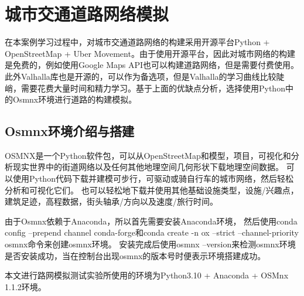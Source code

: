 \chapter{城市交通道路网络模拟}\label{ch:城市交通道路网络模拟}
在本案例学习过程中，对城市交通道路网络的构建采用开源平台Python + OpenStreetMap + Uber Movement。由于使用开源平台，因此对城市网络的构建是免费的，例如使用Google Maps API也可以构建道路网络，但是需要付费使用。此外Valhalla库也是开源的，可以作为备选项，但是Valhalla的学习曲线比较陡峭，需要花费大量时间和精力学习。基于上面的优缺点分析，选择使用Python中的Osmnx环境进行道路的构建模拟。


\section{Osmnx环境介绍与搭建}\label{sec:环境搭建}
OSMNX是一个Python软件包，可以从OpenStreetMap和模型，项目，可视化和分析现实世界中的街道网络以及任何其他地理空间几何形状下载地理空间数据。
可以使用Python代码下载并建模可步行，可驱动或骑自行车的城市网络，然后轻松分析和可视化它们。
也可以轻松地下载并使用其他基础设施类型，设施/兴趣点，建筑足迹，高程数据，街头轴承/方向以及速度/旅行时间。

由于Osmnx依赖于Anaconda，所以首先需要安装Anaconda环境，
然后使用conda config –prepend channel conda-forge和conda create -n ox –strict –channel-priority osmnx命令来创建osmnx环境。
安装完成后使用osmnx --version来检测osmnx环境是否安装成功，当在控制台出现osmnx的版本号时便表示环境搭建成功。

本文进行路网模拟测试实验所使用的环境为Python3.10 + Anaconda + OSMnx 1.1.2环境。


